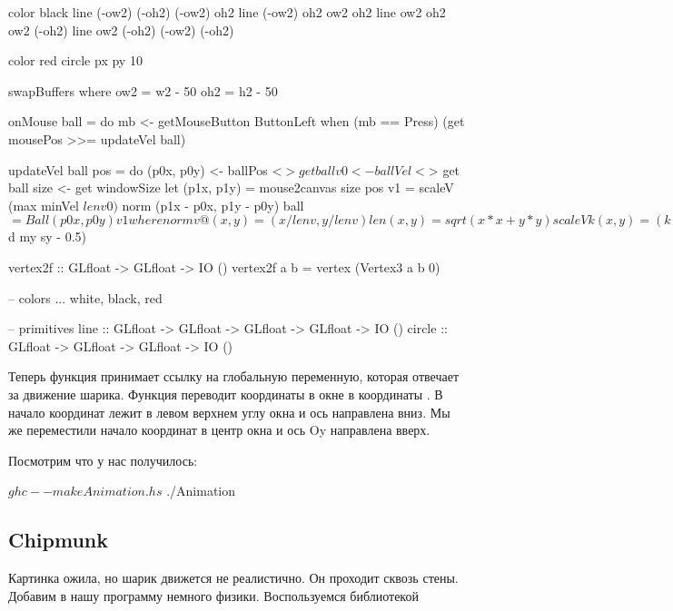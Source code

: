 \begin{code}
    color black
    line (-ow2) (-oh2) (-ow2) oh2
    line (-ow2) oh2    ow2    oh2
    line ow2    oh2    ow2    (-oh2)
    line ow2   (-oh2)  (-ow2) (-oh2)

    color red
    circle px py 10

    swapBuffers
    where ow2 = w2 - 50 
          oh2 = h2 - 50  
    
onMouse ball = do
    mb <- getMouseButton ButtonLeft
    when (mb == Press) (get mousePos >>= updateVel ball)
   
updateVel ball pos = do
    (p0x, p0y) <- ballPos <$> get ball
    v0  <- ballVel <$> get ball
    size <- get windowSize
    let (p1x, p1y) = mouse2canvas size pos 
        v1 = scaleV (max minVel $ len v0) $ norm (p1x - p0x, p1y - p0y)
    ball $= Ball (p0x, p0y) v1
    where norm v@(x, y) = (x / len v, y / len v)
          len  (x, y) = sqrt (x*x + y*y) 
          scaleV k (x, y) = (k*x, k*y)

mouse2canvas :: Size -> Position -> (GLfloat, GLfloat)
mouse2canvas (Size sx sy) (Position mx my) = (x, y)
    where d a b  = fromIntegral a / fromIntegral b
          x  = fromIntegral width * (d mx sx - 0.5)
          y  = fromIntegral height * (negate $ d my sy - 0.5)

vertex2f :: GLfloat -> GLfloat -> IO ()
vertex2f a b = vertex (Vertex3 a b 0)

-- colors
... white, black, red  

-- primitives
line    :: GLfloat -> GLfloat -> GLfloat -> GLfloat -> IO ()
circle  :: GLfloat -> GLfloat -> GLfloat -> IO ()
\end{code}


Теперь функция  принимает ссылку на глобальную 
переменную, которая отвечает за движение шарика.
Функция  переводит координаты в окне 
в координаты . В  начало координат лежит 
в левом верхнем углу окна и ось  направлена вниз. 
Мы же переместили начало координат в центр окна и ось Oy 
направлена вверх.

Посмотрим что у нас получилось:

\begin{code}
$ ghc --make Animation.hs
$ ./Animation
\end{code}

\subsection{Chipmunk}

Картинка ожила, но шарик движется не реалистично. 
Он проходит сквозь стены. Добавим в нашу программу
немного физики. Воспользуемся библиотекой 

